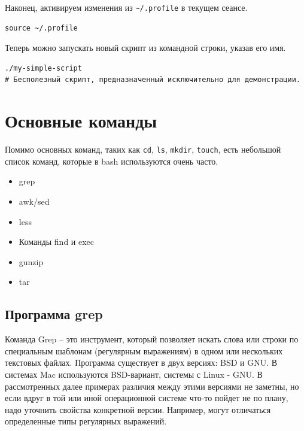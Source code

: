 \documentclass[a4paper,12pt,final,openany]{extbook}
\providecommand{\tightlist}{%
  \setlength{\itemsep}{0pt}\setlength{\parskip}{0pt}}
\begin{document}
Наконец, активируем изменения из
\texttt{\textasciitilde{}/.profile} в текущем сеансе.

\begin{verbatim}
source ~/.profile
\end{verbatim}

Теперь можно запускать новый скрипт из командной строки, указав его имя.

\begin{verbatim}
./my-simple-script
# Бесполезный скрипт, предназначенный исключительно для демонстрации.
\end{verbatim}

\hypertarget{Common-Commands}{%
\section{\texorpdfstring{\protect\hyperlink{Common-Commands}{}Основные
команды}{Основные команды}}\label{Common-Commands}}

Помимо основных команд, таких как \texttt{cd}, \texttt{ls},
\texttt{mkdir}, \texttt{touch}, есть небольшой список команд,
которые в bash используются очень часто.

\begin{itemize}
\tightlist
\item
  grep
\item
  awk/sed
\item
  less
\item
  Команды find и exec
\item
  gunzip
\item
  tar
\end{itemize}

\hypertarget{grep}{%
  \subsection{\texorpdfstring{\protect\hyperlink{grep}{}Программа grep}{Программа grep}}\label{grep}}

Команда Grep -- это инструмент, который позволяет искать слова или строки по специальным шаблонам (регулярным выражениям) в одном или нескольких текстовых файлах. Программа существует в двух версиях: BSD и GNU. В системах Mac используются BSD-вариант, системы с Linux - GNU. В рассмотренных далее примерах различия между этими версиями не заметны, но если вдруг в той или иной операционной системе что-то пойдет не по
плану, надо уточнить свойства конкретной версии. Например, могут отличаться определенные типы регулярных выражений.
\end{document}
